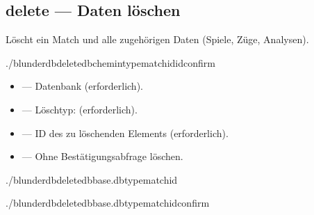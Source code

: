 \documentclass[letterpaper,10pt,german]{sphinxmanual}
\begin{document}
\subsection{delete — Daten löschen}
\label{\detokenize{cli:delete-supprimer-des-donnees}}
\sphinxAtStartPar
Löscht ein Match und alle zugehörigen Daten (Spiele, Züge, Analysen).

\begin{sphinxVerbatim}[commandchars=\\\{\}]
./blunderdbdelete\PYGZhy{}\PYGZhy{}db\PYGZlt{}chemin\PYGZgt{}\PYGZhy{}\PYGZhy{}typematch\PYGZhy{}\PYGZhy{}id\PYGZlt{}id\PYGZgt{}\PYG{o}{[}\PYGZhy{}\PYGZhy{}confirm\PYG{o}{]}
\end{sphinxVerbatim}

\sphinxAtStartPar
{}
\begin{itemize}
\item {} 
\sphinxAtStartPar
{} — Datenbank (erforderlich).

\item {} 
\sphinxAtStartPar
{} — Löschtyp:  (erforderlich).

\item {} 
\sphinxAtStartPar
{} — ID des zu löschenden Elements (erforderlich).

\item {} 
\sphinxAtStartPar
{} — Ohne Bestätigungsabfrage löschen.

\end{itemize}

\sphinxAtStartPar
{}

\begin{sphinxVerbatim}[commandchars=\\\{\}]
./blunderdbdelete\PYGZhy{}\PYGZhy{}dbbase.db\PYGZhy{}\PYGZhy{}typematch\PYGZhy{}\PYGZhy{}id

./blunderdbdelete\PYGZhy{}\PYGZhy{}dbbase.db\PYGZhy{}\PYGZhy{}typematch\PYGZhy{}\PYGZhy{}id\PYGZhy{}\PYGZhy{}confirm
\end{sphinxVerbatim}
\end{document}
